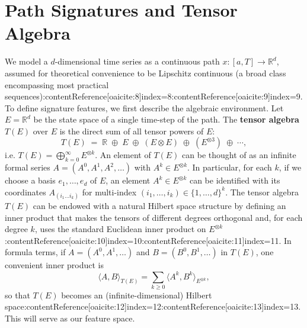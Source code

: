 \documentclass[11pt]{article}
\begin{document}
\section{Path Signatures and Tensor Algebra}
We model a $d$-dimensional time series as a continuous path $x: [a,T] \to \mathbb{R}^d$, assumed for theoretical convenience to be Lipschitz continuous (a broad class encompassing most practical sequences):contentReference[oaicite:8]{index=8}:contentReference[oaicite:9]{index=9}. To define signature features, we first describe the algebraic environment. Let $E = \mathbb{R}^d$ be the state space of a single time-step of the path. The \textbf{tensor algebra} $T(E)$ over $E$ is the direct sum of all tensor powers of $E$:
\[
T(E) \;=\; \mathbb{R} \;\oplus\; E \;\oplus\; (E\otimes E) \;\oplus\; (E^{\otimes 3}) \;\oplus \;\cdots,
\] 
i.e. $T(E) = \bigoplus_{k=0}^{\infty} E^{\otimes k}$. An element of $T(E)$ can be thought of as an infinite formal series $A = (A^0, A^1, A^2, \ldots)$ with $A^k \in E^{\otimes k}$. In particular, for each $k$, if we choose a basis $e_1,\dots,e_d$ of $E$, an element $A^k \in E^{\otimes k}$ can be identified with its coordinates $A_{(i_1\ldots i_k)}$ for multi-index $(i_1,\dots,i_k)\in\{1,\dots,d\}^k$. The tensor algebra $T(E)$ can be endowed with a natural Hilbert space structure by defining an inner product that makes the tensors of different degrees orthogonal and, for each degree $k$, uses the standard Euclidean inner product on $E^{\otimes k}$:contentReference[oaicite:10]{index=10}:contentReference[oaicite:11]{index=11}. In formula terms, if $A=(A^0,A^1,\dots)$ and $B=(B^0,B^1,\dots)$ in $T(E)$, one convenient inner product is 
\[
\langle A, B\rangle_{T(E)} = \sum_{k\ge0} \langle A^k, B^k\rangle_{E^{\otimes k}}, 
\] 
so that $T(E)$ becomes an (infinite-dimensional) Hilbert space:contentReference[oaicite:12]{index=12}:contentReference[oaicite:13]{index=13}. This will serve as our feature space.
\end{document}

